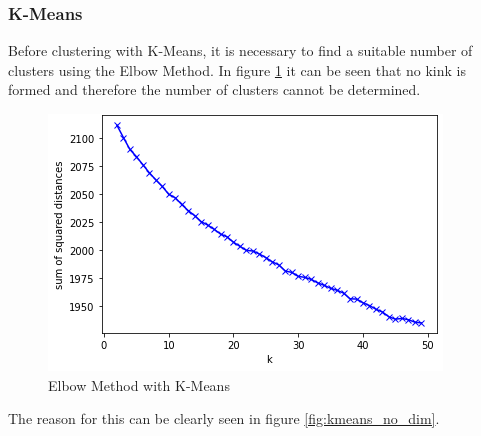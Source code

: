 \subsubsection{K-Means}\label{subsubsec:kmeans}
Before clustering with K-Means, it is necessary to find a suitable number of clusters using the Elbow Method.
In figure \ref{fig:elbow} it can be seen that no kink is formed and therefore the number of clusters cannot be determined.
\begin{figure}
    \centering
    \includegraphics[width=0.5\linewidth]{imgs/elbow.png}
    \caption{Elbow Method with K-Means}
    \label{fig:elbow}
\end{figure}
The reason for this can be clearly seen in figure \ref{fig:kmeans_no_dim}.
